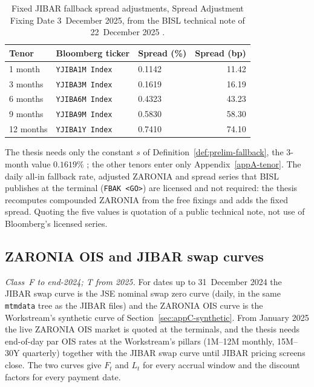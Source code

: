 \begin{table}[htbp]\centering\small
\caption{Fixed JIBAR fallback spread adjustments, Spread Adjustment Fixing Date 3~December 2025, from the BISL technical note of 22~December 2025 \citep[p.~1, Table]{bisl2025}.}\label{tab:appC-cas}
\begin{tabular}{lllr}
\toprule
Tenor & Bloomberg ticker & Spread (\%) & Spread (bp)\\
\midrule
1 month  & \texttt{YJIBA1M Index} & 0.1142 & 11.42\\
3 months & \texttt{YJIBA3M Index} & 0.1619 & 16.19\\
6 months & \texttt{YJIBA6M Index} & 0.4323 & 43.23\\
9 months & \texttt{YJIBA9M Index} & 0.5830 & 58.30\\
12 months& \texttt{YJIBA1Y Index} & 0.7410 & 74.10\\
\bottomrule
\end{tabular}
\end{table}

The thesis needs only the constant $s$ of Definition~\ref{def:prelim-fallback}, the 3-month value $0.1619\%$ \citep[p.~1, Table]{bisl2025}; the other tenors enter only Appendix~\ref{appA-tenor}. The daily all-in fallback rate, adjusted ZARONIA and spread series that BISL publishes at the terminal (\texttt{FBAK <GO>}) are licensed and not required: the thesis recomputes compounded ZARONIA from the free fixings and adds the fixed spread. Quoting the five values is quotation of a public technical note, not use of Bloomberg's licensed series.


\subsection{ZARONIA OIS and JIBAR swap curves}\label{sec:appC-curves}

\emph{Class~F to end-2024; T from 2025.} For dates up to 31~December 2024 the JIBAR swap curve is the JSE nominal swap zero curve (daily, in the same \texttt{mtmdata} tree as the JIBAR files) and the ZARONIA OIS curve is the Workstream's synthetic curve of Section~\ref{sec:appC-synthetic}. From January 2025 the live ZARONIA OIS market is quoted at the terminals, and the thesis needs end-of-day par OIS rates at the Workstream's pillars (1M--12M monthly, 15M--30Y quarterly) together with the JIBAR swap curve until JIBAR pricing screens close. The two curves give $F_t$ and $L_t$ for every accrual window and the discount factors for every payment date.

